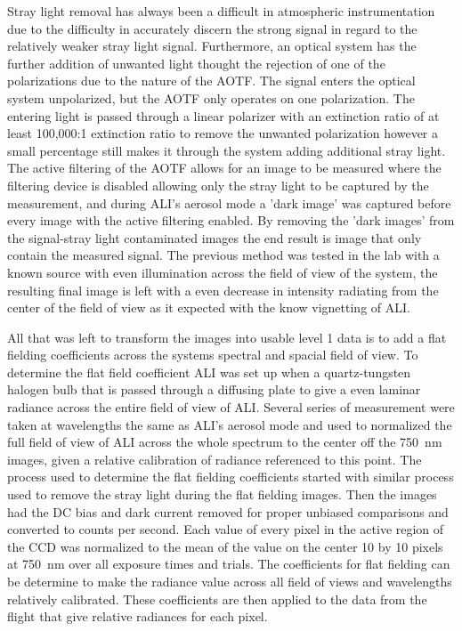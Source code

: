 \documentclass[12pt]{article}
\begin{document}
Stray light removal has always been a difficult in atmospheric instrumentation due to the difficulty in accurately discern the strong signal in regard to the relatively weaker stray light signal. Furthermore, an optical system has the further addition of unwanted light thought the rejection of one of the polarizations due to the nature of the AOTF. The signal enters the optical system unpolarized, but the AOTF only operates on one polarization. The entering light is passed through a linear polarizer with an extinction ratio of at least 100,000:1 extinction ratio to remove the unwanted polarization however a small percentage still makes it through the system adding additional stray light. The active filtering of the AOTF allows for an image to be measured where the filtering device is disabled allowing only the stray light to be captured by the measurement, and during ALI's aerosol mode a 'dark image' was captured before every image with the active filtering enabled. By removing the 'dark images' from the signal-stray light contaminated images the end result is image that only contain the measured signal. The previous method was tested in the lab with a known source with even illumination across the field of view of the system, the resulting final image is left with a even decrease in intensity radiating from the center of the field of view as it expected with the know vignetting of ALI.

All that was left to transform the images into usable level 1 data is to add a flat fielding coefficients across the systems spectral and spacial field of view. To determine the flat field coefficient ALI was set up when a quartz-tungsten halogen bulb that is passed through a diffusing plate to give a even laminar radiance across the entire field of view of ALI. Several series of measurement were taken at wavelengths the same as ALI's aerosol mode and used to normalized the full field of view of ALI across the whole spectrum to the center off the 750~nm images, given a relative calibration of radiance referenced to this point. The process used to determine the flat fielding coefficients started with similar process used to remove the stray light during the flat fielding images. Then the images had the DC bias and dark current removed for proper unbiased comparisons and converted to counts per second. Each value of every pixel in the active region of the CCD was normalized to the mean of the value on the center 10 by 10 pixels at 750~nm over all exposure times and trials. The coefficients for flat fielding can be determine to make the radiance value across all field of views and wavelengths relatively calibrated. These coefficients are then applied to the data from the flight that give relative radiances for each pixel.
\end{document}
